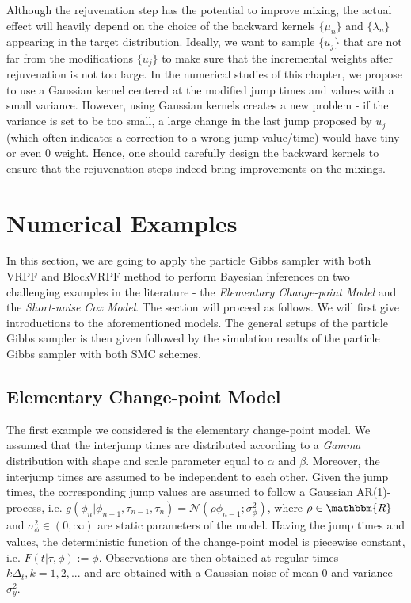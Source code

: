 \documentclass[12pt,a4paper]{article}
\begin{document}
Although the rejuvenation step has the potential to improve mixing, the actual effect will heavily depend on the choice of the backward kernels \(\{\mu_n\}\) and \(\{\lambda_n\}\) appearing in the target distribution. Ideally, we want to sample \(\{\bar{u}_j\}\) that are not far from the modifications \(\{u_j\}\) to make sure that the incremental weights after rejuvenation is not too large. In the numerical studies of this chapter, we propose to use a Gaussian kernel centered at the modified jump times and values with a small variance. However, using Gaussian kernels creates a new problem - if the variance is set to be too small, a large change in the last jump proposed by \(u_j\) (which often indicates a correction to a wrong jump value/time) would have tiny or even 0 weight. Hence, one should carefully design the backward kernels to ensure that the rejuvenation steps indeed bring improvements on the mixings. 
\section{Numerical Examples}
In this section, we are going to apply the particle Gibbs sampler with both VRPF and BlockVRPF method to perform Bayesian inferences on two challenging examples in the literature - the \textit{Elementary Change-point Model} and the \textit{Short-noise Cox Model}. The section will proceed as follows. We will first give introductions to the aforementioned models. The general setups of the particle Gibbs sampler is then given followed by the simulation results of the particle Gibbs sampler with both SMC schemes. 
\subsection{Elementary Change-point Model}
The first example we considered is the elementary change-point model. We assumed that the interjump times are distributed according to a \textit{Gamma} distribution with shape and scale parameter equal to \(\alpha\) and \(\beta\). Moreover, the interjump times are assumed to be independent to each other. Given the jump times, the corresponding jump values are assumed to follow a Gaussian AR(1)-process, i.e. \(g(\phi_n|\phi_{n-1},\tau_{n-1},\tau_n) = \mathcal{N}(\rho\phi_{n-1};\sigma_{\phi}^2)\), where \(\rho \in \mathbbm{R}\) and \(\sigma_{\phi}^2 \in (0,\infty)\) are static parameters of the model. Having the jump times and values, the deterministic function of the change-point model is piecewise constant, i.e. \(F(t|\tau,\phi):= \phi\). Observations are then obtained at regular times \(k\Delta_t, k= 1,2,...\) and are obtained with a Gaussian noise of mean \(0\) and variance \(\sigma_y^2\). 
\end{document}
